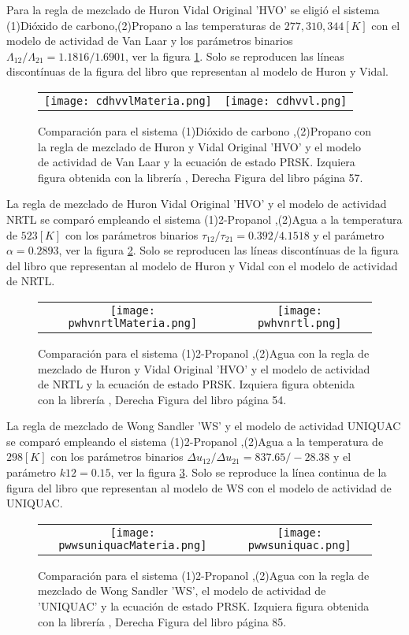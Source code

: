 Para la regla de mezclado de Huron Vidal Original 'HVO' se eligió el sistema (1)Dióxido de carbono,(2)Propano a las temperaturas de $277, 310, 344 [K]$ con el modelo de actividad de Van Laar y los parámetros binarios $\Lambda_{12}/\Lambda_{21}=1.1816/1.6901$, ver la figura \ref{fig:cdhvvl}. Solo se reproducen las líneas discontínuas de la figura del libro que representan al modelo de Huron y Vidal.

\begin{figure}[H]
	\begin{tabular}{c c}
		\texttt{[image: cdhvvlMateria.png]}
		&
		 \texttt{[image: cdhvvl.png]}
	\end{tabular}
	\caption{Comparación para el sistema (1)Dióxido de carbono ,(2)Propano con la regla de mezclado de Huron y Vidal Original 'HVO' y el modelo de actividad de Van Laar y la ecuación de estado PRSK.  Izquiera figura obtenida con la librería \Materia, Derecha Figura del libro \cite{mvle} página 57.} 
	\label{fig:cdhvvl}
\end{figure}

La regla de mezclado de Huron Vidal Original 'HVO' y el modelo de actividad NRTL se comparó empleando el sistema (1)2-Propanol ,(2)Agua a la temperatura de $523 [K]$ con los parámetros binarios $\tau_{12} /\tau_{21}=0.392/4.1518$ y el parámetro $\alpha = 0.2893$, ver la figura \ref{fig:pwhvnrtl}. Solo se reproducen las líneas discontínuas de la figura del libro que representan al modelo de Huron y Vidal con el modelo de actividad de NRTL.
\begin{figure}[H]
	\begin{tabular}{c c}
		\texttt{[image: pwhvnrtlMateria.png]}
		&
		 \texttt{[image: pwhvnrtl.png]}
	\end{tabular}
	\caption{Comparación para el sistema (1)2-Propanol ,(2)Agua con la regla de mezclado de Huron y Vidal Original 'HVO' y el modelo de actividad de NRTL y la ecuación de estado PRSK.  Izquiera figura obtenida con la librería \Materia, Derecha Figura del libro \cite{mvle} página 54.} 
	\label{fig:pwhvnrtl}
\end{figure}


La regla de mezclado de Wong Sandler 'WS' y el modelo de actividad UNIQUAC se comparó empleando el sistema (1)2-Propanol ,(2)Agua a la temperatura de $298 [K]$ con los parámetros binarios $\Delta u_{12} /\Delta u_{21}=837.65/-28.38$ y el parámetro $k12 = 0.15$, ver la figura \ref{fig:pwwsuniquac}. Solo se reproduce la línea continua de la figura del libro que representan al modelo de WS con el modelo de actividad de UNIQUAC.
\begin{figure}[H]
	\begin{tabular}{c c}
		\texttt{[image: pwwsuniquacMateria.png]}
		&
		 \texttt{[image: pwwsuniquac.png]}
	\end{tabular}
	\caption{Comparación para el sistema (1)2-Propanol ,(2)Agua con la regla de mezclado de Wong Sandler 'WS', el modelo de actividad de 'UNIQUAC' y la ecuación de estado PRSK.  Izquiera figura obtenida con la librería \Materia, Derecha Figura del libro \cite{mvle} página 85.} 
	\label{fig:pwwsuniquac}
\end{figure}


